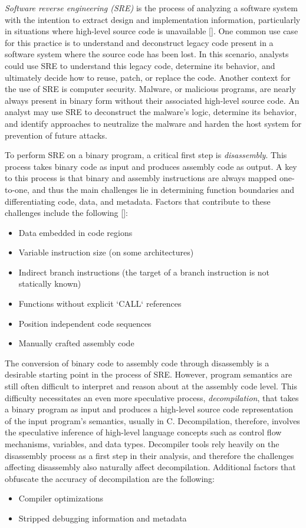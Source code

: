 \documentclass[conference]{IEEEtran}
\begin{document}
\emph{Software reverse engineering (SRE)} is the process of analyzing a software system with the intention to extract design and implementation information, particularly in situations where high-level source code is unavailable []. One common use case for this practice is to understand and deconstruct legacy code present in a software system where the source code has been lost. In this scenario, analysts could use SRE to understand this legacy code, determine its behavior, and ultimately decide how to reuse, patch, or replace the code. Another context for the use of SRE is computer security. Malware, or malicious programs, are nearly always present in binary form without their associated high-level source code. An analyst may use SRE to deconstruct the malware's logic, determine its behavior, and identify approaches to neutralize the malware and harden the host system for prevention of future attacks.

To perform SRE on a binary program, a critical first step is \emph{disassembly}. This process takes binary code as input and produces assembly code as output. A key to this process is that binary and assembly instructions are always mapped one-to-one, and thus the main challenges lie in determining function boundaries and differentiating code, data, and metadata. Factors that contribute to these challenges include the following []:
\begin{itemize}
    \item Data embedded in code regions
    \item Variable instruction size (on some architectures)
    \item Indirect branch instructions (the target of a branch instruction is not statically known)
    \item Functions without explicit `CALL` references
    \item Position independent code sequences
    \item Manually crafted assembly code
\end{itemize}

The conversion of binary code to assembly code through disassembly is a desirable starting point in the process of SRE. However, program semantics are still often difficult to interpret and reason about at the assembly code level. This difficulty necessitates an even more speculative process, \emph{decompilation}, that takes a binary program as input and produces a high-level source code representation of the input program's semantics, usually in C. Decompilation, therefore, involves the speculative inference of high-level language concepts such as control flow mechanisms, variables, and data types. Decompiler tools rely heavily on the disassembly process as a first step in their analysis, and therefore the challenges affecting disassembly also naturally affect decompilation. Additional factors that obfuscate the accuracy of decompilation are the following:
\begin{itemize}
    \item Compiler optimizations
    \item Stripped debugging information and metadata
\end{itemize}
\end{document}
